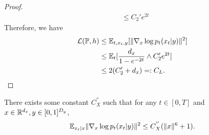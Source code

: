\documentclass[11pt]{article}
\numberwithin{equation}{section}
\renewcommand{\P}{\mathbb{P}}
\begin{document}
\begin{proof}
\begin{equation}
\begin{aligned}
        &\leq C_2'e^{2t}
        \end{aligned}
    \end{equation}
    Therefore, we have
    \begin{equation}
        \begin{aligned}
            \mathcal{L}(\P,h)
            &\leq \E_{t,x_t,y}[\|\nabla_x\log p_t(x_t|y)\|^2] \\
            &\leq \E_t[\frac{d_x}{1-e^{-2t}}\wedge C_2'e^{2t}] \\
            &\leq 2(C_2'+d_x)=:C_L.
        \end{aligned}
    \end{equation}
\end{proof}

\begin{lemma}\label{lem:bound score_t}
    There exists some constant $C_X^{''}$ such that for any $t\in[0,T]$ and $x\in\mathbb{R}^{d_x},y\in[0,1]^{D_y}$,
    \begin{equation}
        \mathbb{E}_{x_t|x}\|\nabla_x\log p_t(x_t|y)\|^2\leq C_X^{''}(\|x\|^6+1).
    \end{equation}
\end{lemma}
\end{document}
